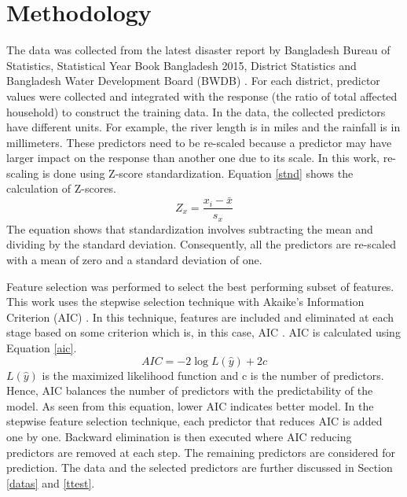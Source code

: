 \documentclass[preprint,review,12pt]{elsarticle}
\begin{document}
\section{Methodology}
\label{method}
The data was collected from the latest disaster report by Bangladesh Bureau of Statistics, Statistical Year Book Bangladesh 2015, District Statistics and Bangladesh Water Development Board (BWDB) \cite{disaster,disstat,statyear,hydrodata}. For each district, predictor values were collected and integrated with the response (the ratio of total affected household) to construct the training data. In the data, the collected predictors have different units. For example, the river length is in miles and the rainfall is in millimeters. These predictors need to be re-scaled because a predictor may have larger impact on the response than another one due to its scale. In this work, re-scaling is done using Z-score standardization.  Equation \ref{stnd} shows the calculation of Z-scores. 
\begin{equation}
Z_{x}=\frac{x_{i}-\bar{x}}{s_{x}}
\label{stnd}
\end{equation}
The equation shows that standardization involves subtracting the mean and dividing by the standard deviation. Consequently, all the predictors are re-scaled with a mean of zero and a standard deviation of one. 

Feature selection was performed to select the best performing subset of features. This work uses the stepwise selection technique with Akaike's Information Criterion (AIC) \cite{akaike1998information}. In this technique, features are included and eliminated at each stage based on some criterion which is, in this case, AIC \cite{kadane2004methods}. AIC is calculated using Equation \ref{aic}. 
\begin{equation}
AIC=-2 \log L(\hat{y})+2c
\label{aic}
\end{equation}
$L(\hat{y})$ is the maximized likelihood function and c is the number of predictors. Hence, AIC balances the number of predictors with the predictability of the model. As seen from this equation, lower AIC indicates better model. In the stepwise feature selection technique, each predictor that reduces AIC is added one by one. Backward elimination is then executed where AIC reducing predictors are removed at each step. The remaining predictors are considered for prediction. The data and the selected predictors are further discussed in Section \ref{datas} and \ref{ttest}.
\end{document}

